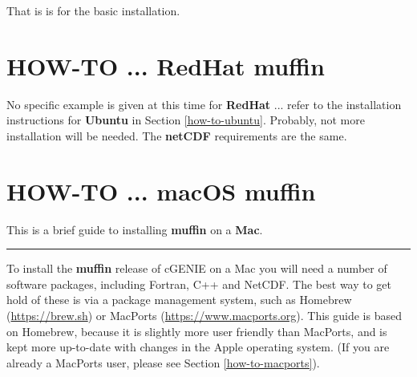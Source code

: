 \documentclass[11pt,fleqn]{book} %
\begin{document}
\noindent That is is for the basic installation.


\newpage


\section{HOW-TO ... RedHat muffin}\label{how-to-redhat}
\vspace{2mm}


No specific example is given at this time for \textbf{RedHat} ... refer to the installation instructions for \textbf{Ubuntu} in Section \ref{how-to-ubuntu}. Probably, not more installation will be needed. The \textbf{netCDF} requirements are the same.


\newpage


\section{HOW-TO ... macOS muffin}\label{how-to-macos}
\vspace{2mm}

This is a brief guide to installing \textbf{muffin} on a \textbf{Mac}.

\vspace{1mm}
\noindent\rule{4cm}{0.1mm}
\vspace{2mm}

\noindent To install the \textbf{muffin} release of cGENIE on a Mac you will need a number of software packages, including Fortran, C++ and NetCDF. The best way to get hold of these is via a package management system, such as Homebrew (\href{}{https://brew.sh}) or MacPorts (\href{}{https://www.macports.org}). This guide is based on Homebrew, because it is slightly more user friendly than MacPorts, and is kept more up-to-date with changes in the Apple operating system. (If you are already a MacPorts user, please see Section \ref{how-to-macports}).
\end{document}
